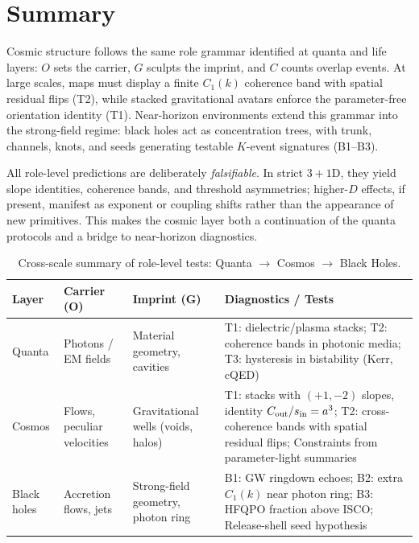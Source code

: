 \documentclass[12pt,a4paper,oneside]{scrreprt}
\begin{document}
\section*{Summary}

Cosmic structure follows the same role grammar identified at 
quanta and life layers: $O$ sets the carrier, $G$ sculpts the imprint, 
and $C$ counts overlap events. 
At large scales, maps must display a finite $C_1(k)$ coherence band with 
spatial residual flips (T2), while stacked gravitational avatars enforce 
the parameter-free orientation identity (T1). 
Near-horizon environments extend this grammar into the strong-field regime: 
black holes act as concentration trees, with trunk, channels, knots, and 
seeds generating testable $K$-event signatures (B1–B3). 

All role-level predictions are deliberately \emph{falsifiable}. 
In strict $3{+}1$D, they yield slope identities, coherence bands, and 
threshold asymmetries; higher-$D$ effects, if present, manifest as 
exponent or coupling shifts rather than the appearance of new primitives. 
This makes the cosmic layer both a continuation of the quanta protocols 
and a bridge to near-horizon diagnostics.

\begin{table}[h]
\centering
\caption{Cross-scale summary of role-level tests: Quanta $\rightarrow$ Cosmos $\rightarrow$ Black Holes.}
\begin{tabular}{p{2.7cm} p{3.5cm} p{3.5cm} p{3.5cm}}
\toprule
\textbf{Layer} & \textbf{Carrier (O)} & \textbf{Imprint (G)} & \textbf{Diagnostics / Tests} \\
\midrule
Quanta & Photons / EM fields & Material geometry, cavities & 
T1: dielectric/plasma stacks; 
T2: coherence bands in photonic media; 
T3: hysteresis in bistability (Kerr, cQED) \\
\addlinespace
Cosmos & Flows, peculiar velocities & Gravitational wells (voids, halos) & 
T1: stacks with $(+1,-2)$ slopes, identity $C_{\rm out}/s_{\rm in}=a^3$; 
T2: cross-coherence bands with spatial residual flips; 
Constraints from parameter-light summaries \\
\addlinespace
Black holes & Accretion flows, jets & Strong-field geometry, photon ring & 
B1: GW ringdown echoes; 
B2: extra $C_1(k)$ near photon ring; 
B3: HFQPO fraction above ISCO; 
Release-shell seed hypothesis \\
\bottomrule
\end{tabular}
\end{table}
\end{document}
